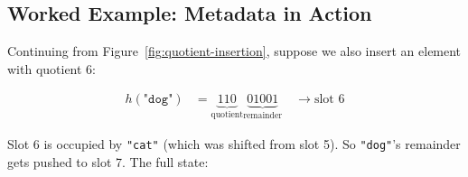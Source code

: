 \subsection{Worked Example: Metadata in Action}

Continuing from Figure~\ref{fig:quotient-insertion}, suppose we also 
insert an element with quotient 6:

\begin{align*}
  h(\texttt{"dog"}) &= \underbrace{110}_{\text{quotient}} 
                       \underbrace{01001}_{\text{remainder}} 
                       \quad \rightarrow \text{slot } 6
\end{align*}

Slot 6 is occupied by \texttt{"cat"} (which was shifted from slot 5). 
So \texttt{"dog"}'s remainder gets pushed to slot 7. The full state:

